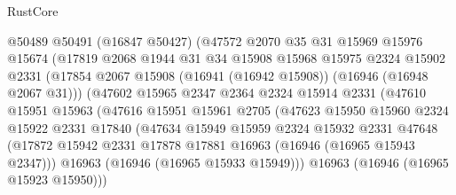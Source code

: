 \begin{lexlean}{RustCore}
\begin{coremodule}
                        @50489
                        @50491
                        (@16847 @50427)
                        (@47572
                          @2070
                          @35
                          @31
                          @15969
                          @15976
                          @15674
                          (@17819
                            @2068
                            @1944
                            @31
                            @34
                            @15908
                            @15968
                            @15975
                            @2324
                            @15902
                            @2331
                            (@17854
                              @2067
                              @15908
                              (@16941 (@16942 @15908))
                              (@16946 (@16948 @2067 @31)))
                            (@47602
                              @15965
                              @2347
                              @2364
                              @2324
                              @15914
                              @2331
                              (@47610
                                @15951
                                @15963
                                (@47616
                                  @15951
                                  @15961
                                  @2705
                                  (@47623
                                    @15950
                                    @15960
                                    @2324
                                    @15922
                                    @2331
                                    @17840
                                    (@47634
                                      @15949
                                      @15959
                                      @2324
                                      @15932
                                      @2331
                                      @47648
                                      (@17872
                                        @15942
                                        @2331
                                        @17878
                                        @17881
                                        @16963
                                        (@16946 (@16965 @15943 @2347)))
                                      @16963
                                      (@16946 (@16965 @15933 @15949)))
                                    @16963
                                    (@16946 (@16965 @15923 @15950)))

\end{coremodule}
\end{lexlean}
